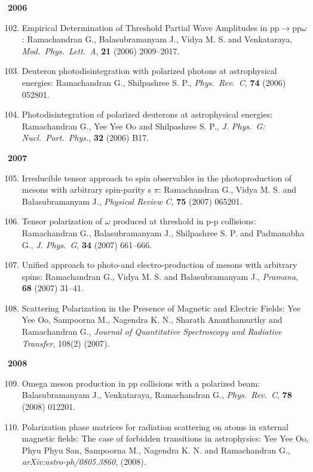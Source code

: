 \textbf{2006}
\begin{enumerate}
\setcounter{enumi}{101}
\item Empirical Determination of Threshold Partial Wave Amplitudes in pp$\to$pp$\omega$: Ramachandran G., Balasubramanyam J., Vidya M. S. and Venkataraya, \textit{Mod.\ Phys.\ Lett.\ A}, {\bf 21} (2006) 2009--2017.
\item Deuteron photodisintegration with polarized photons at astrophysical energies: Ramachandran G., Shilpashree S. P., \textit{Phys.\ Rev.\ C}, {\bf 74} (2006) 052801.
\item Photodisintegration of polarized deuterons at astrophysical energies: Ramachandran G., Yee Yee Oo and Shilpashree S. P., \textit{J. Phys.\ G: Nucl.\ Part.\ Phys.}, {\bf 32} (2006) B17.
\end{enumerate}
\textbf{2007}
\begin{enumerate}
\setcounter{enumi}{104}
\item Irreducible tensor approach to spin observables in the photoproduction of mesons with arbitrary spin-parity s $\pi$: Ramachandran G., Vidya M. S. and Balasubramanyam J., \textit{Physical Review C}, {\bf 75} (2007) 065201.
\item Tensor polarization of $\omega$ produced at threshold in p-p collisions: Ramachandran G., Balasubramanyam J., Shilpashree S. P. and Padmanabha G., \textit{J. Phys.\ G}, {\bf 34} (2007) 661--666.
\item Unified approach to photo-and electro-production of mesons with arbitrary spins: Ramachandran G., Vidya M. S. and Balasubramanyam J., \textit{Pramana}, {\bf 68} (2007) 31--41.
\item Scattering Polarization in the Presence of Magnetic and Electric Fields: Yee Yee Oo, Sampoorna M., Nagendra K. N., Sharath Ananthamurthy and Ramachandran G., \textit{Journal of Quantitative Spectroscopy and Radiative Transfer}, 108(2) (2007).
\end{enumerate}
\textbf{2008}
\begin{enumerate}
\setcounter{enumi}{108}
\item Omega meson production in pp collisions with a polarized beam: Balasubramanyam J., Venkataraya, Ramachandran G., \textit{Phys.\ Rev.\ C}, {\bf 78} (2008) 012201.
\item Polarization phase matrices for radiation scattering on atoms in external magnetic fields: The case of forbidden transitions in astrophysics: Yee Yee Oo, Phyu Phyu San, Sampoorna M., Nagendra K. N. and Ramachandran G., \textit{arXiv:astro-ph/0805.3860}, (2008).
\end{enumerate}
